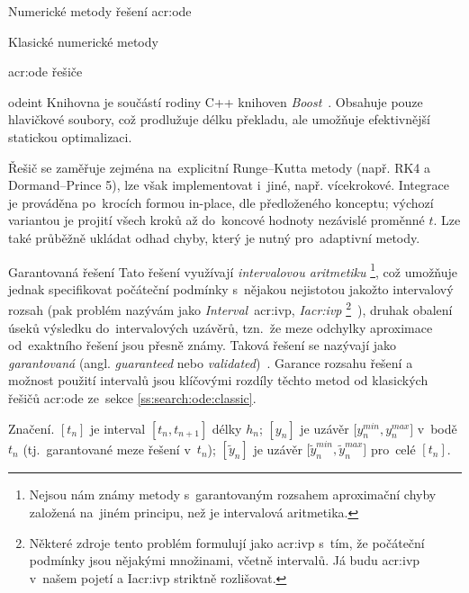 \documentclass[thesis=M,czech]{FITthesis}[2012/06/26]
\newcommand{\acrlabel}[1]{acr:#1}
\newcommand{\acr}[1]{\acrshort{\acrlabel{#1}}}
\newcommand{\hl}[1]{\textit{#1}}
\newcommand{\name}[1]{\hl{#1}}
\newcommand{\cit}[1]{\cite{#1}}
\newcommand{\rf}[1]{\ref{#1}}
\newcommand{\pred}[1]{\ensuremath{\tilde{#1}}}
\begin{document}
\begin{section}{Numerické metody řešení \acr{ode}}
\begin{subsection}{Klasické numerické metody}
\begin{subsubsection}{\acr{ode} řešiče}
\begin{paragraph}{odeint}
Knihovna je součástí rodiny C++ knihoven \name{Boost}~\cit{boost-libs}.
Obsahuje pouze hlavičkové soubory,
což prodlužuje délku překladu,
ale umožňuje efektivnější statickou optimalizaci.

Řešič se zaměřuje zejména na~explicitní Runge--Kutta metody
(např. RK4 a Dormand--Prince 5),
lze však implementovat i~jiné, např. vícekrokové.
Integrace je prováděna po~krocích formou in-place,
dle předloženého konceptu;
výchozí variantou je projití všech kroků
až do~koncové hodnoty nezávislé proměnné $t$.
Lze také průběžně ukládat odhad chyby,
který je nutný pro~adaptivní metody.
\end{paragraph} %


\end{subsubsection} %


\end{subsection} %


\begin{subsection}{Garantovaná řešení}\label{ss:search:ode:valid}
Tato řešení využívají \name{intervalovou aritmetiku}%
\footnote{Nejsou nám známy metody s~garantovaným rozsahem aproximační chyby
založená na~jiném principu, než je intervalová aritmetika.},
což umožňuje jednak specifikovat počáteční podmínky
s~nějakou nejistotou jakožto intervalový rozsah
(pak problém nazývám jako \name{Interval}~\acr{ivp},
\name{I\acr{ivp}}%
\footnote{Některé zdroje tento problém formulují
jako \acr{ivp} s~tím, že počáteční podmínky
jsou nějakými množinami, včetně intervalů.
Já budu \acr{ivp} v~našem pojetí a I\acr{ivp}
striktně rozlišovat.}~\cit{ode-valid-runge_kutta-art}),
druhak obalení úseků výsledku do~intervalových uzávěrů,
tzn.~že meze odchylky aproximace od~exaktního řešení
jsou přesně známy.
Taková řešení se nazývají jako \name{garantovaná}
(angl. \name{guaranteed}
nebo \name{validated})~\cit{ode-valid-runge_kutta-art}.
Garance rozsahu řešení a možnost použití intervalů
jsou klíčovými rozdíly
těchto metod od klasických řešičů \acr{ode}
ze~sekce \rf{ss:search:ode:classic}.


\begin{paragraph}{Značení.}\label{p:search:ode:valid:sign}
${[t_n]}$ je interval ${[t_{n}, t_{n+1}]}$ délky $h_n$;
${[y_n]}$ je uzávěr ${[y^{min}_{n}, y^{max}_{n}}]$ v~bodě $t_n$
(tj.~garantované meze řešení v~$t_n$);
${[\pred{y}_n]}$ je uzávěr ${[\pred{y}^{min}_{n}, \pred{y}^{max}_{n}}]$
pro~celé ${[t_n]}$.
\end{paragraph} %


\end{subsection}
\end{section}
\end{document}
